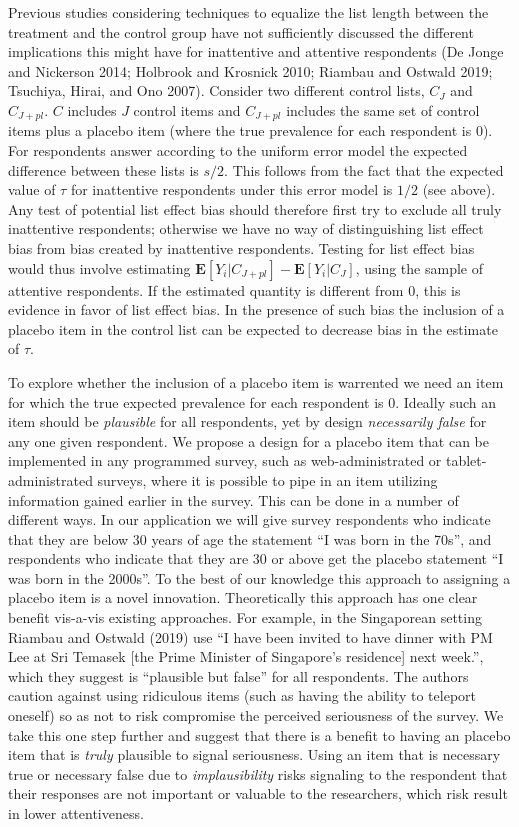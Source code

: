 \documentclass[]{article}
\begin{document}
Previous studies considering techniques to equalize the list length
between the treatment and the control group have not sufficiently
discussed the different implications this might have for inattentive and
attentive respondents (De Jonge and Nickerson 2014; Holbrook and
Krosnick 2010; Riambau and Ostwald 2019; Tsuchiya, Hirai, and Ono 2007).
Consider two different control lists, \(C_{J}\) and \(C_{J+pl}\). \(C\)
includes \(J\) control items and \(C_{J+pl}\) includes the same set of
control items plus a placebo item (where the true prevalence for each
respondent is 0). For respondents answer according to the uniform error
model the expected difference between these lists is \(s/2\). This
follows from the fact that the expected value of \(\tau\) for
inattentive respondents under this error model is \(1/2\) (see above).
Any test of potential list effect bias should therefore first try to
exclude all truly inattentive respondents; otherwise we have no way of
distinguishing list effect bias from bias created by inattentive
respondents. Testing for list effect bias would thus involve estimating
\(\mathbf{E}[Y_{i}|C_{J+pl}] - \mathbf{E}[Y_{i}|C_{J}]\), using the
sample of attentive respondents. If the estimated quantity is different
from 0, this is evidence in favor of list effect bias. In the presence
of such bias the inclusion of a placebo item in the control list can be
expected to decrease bias in the estimate of \(\tau\).

To explore whether the inclusion of a placebo item is warrented we need
an item for which the true expected prevalence for each respondent is 0.
Ideally such an item should be \emph{plausible} for all respondents, yet
by design \emph{necessarily false} for any one given respondent. We
propose a design for a placebo item that can be implemented in any
programmed survey, such as web-administrated or tablet-administrated
surveys, where it is possible to pipe in an item utilizing information
gained earlier in the survey. This can be done in a number of different
ways. In our application we will give survey respondents who indicate
that they are below 30 years of age the statement ``I was born in the
70s'', and respondents who indicate that they are 30 or above get the
placebo statement ``I was born in the 2000s''. To the best of our
knowledge this approach to assigning a placebo item is a novel
innovation. Theoretically this approach has one clear benefit vis-a-vis
existing approaches. For example, in the Singaporean setting Riambau and
Ostwald (2019) use ``I have been invited to have dinner with PM Lee at
Sri Temasek {[}the Prime Minister of Singapore's residence{]} next
week.'', which they suggest is ``plausible but false'' for all
respondents. The authors caution against using ridiculous items (such as
having the ability to teleport oneself) so as not to risk compromise the
perceived seriousness of the survey. We take this one step further and
suggest that there is a benefit to having an placebo item that is
\emph{truly} plausible to signal seriousness. Using an item that is
necessary true or necessary false due to \emph{implausibility} risks
signaling to the respondent that their responses are not important or
valuable to the researchers, which risk result in lower attentiveness.
\end{document}
